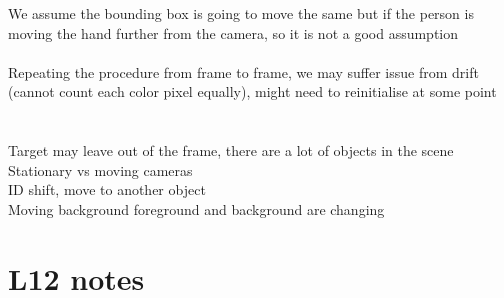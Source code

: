 \documentclass[11pt]{article}
\begin{document}
We assume the bounding box is going to move the same but if the person is moving the hand further from the camera, so it is not a good assumption
\\\\
Repeating the procedure from frame to frame, we may suffer issue from drift (cannot count each color pixel equally), might need to reinitialise at some point\\\\
\\
Target may leave out of the frame, there are a lot of objects in the scene\\
Stationary vs moving cameras\\
ID shift, move to another object\\
Moving background foreground and background are changing 
\\
\section*{L12 notes}
\end{document}
